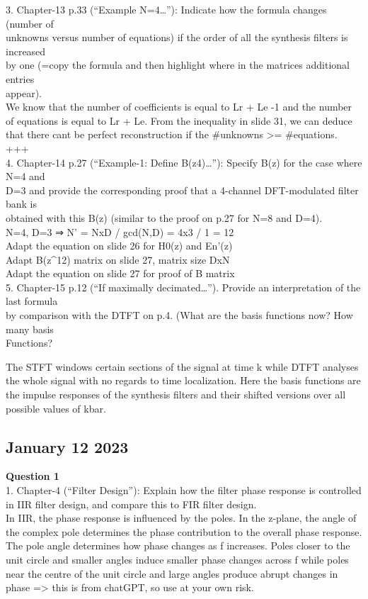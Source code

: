 \documentclass[
  a4paper,
  ,captions=tableheading
]{scrartcl}
\begin{document}
3. Chapter-13 p.33 (``Example N=4\ldots''): Indicate how the formula
changes (number of\\
unknowns versus number of equations) if the order of all the synthesis
filters is increased\\
by one (=copy the formula and then highlight where in the matrices
additional entries\\
appear).\\
We know that the number of coefficients is equal to Lr + Le -1 and the
number of equations is equal to Lr + Le. From the inequality in slide
31, we can deduce that there cant be perfect reconstruction if the
\#unknowns \textgreater= \#equations.\\
+++\\
4. Chapter-14 p.27 (``Example-1: Define B(z4)\ldots''): Specify B(z) for
the case where N=4 and\\
D=3 and provide the corresponding proof that a 4-channel DFT-modulated
filter bank is\\
obtained with this B(z) (similar to the proof on p.27 for N=8 and
D=4).\\
N=4, D=3 ⇒ N' = NxD / gcd(N,D) = 4x3 / 1 = 12\\
Adapt the equation on slide 26 for H0(z) and En'(z)\\
Adapt B(z\^{}12) matrix on slide 27, matrix size DxN\\
Adapt the equation on slide 27 for proof of B matrix\\
5. Chapter-15 p.12 (``If maximally decimated\ldots''). Provide an
interpretation of the last formula\\
by comparison with the DTFT on p.4. (What are the basis functions now?
How many basis\\
Functions?

The STFT windows certain sections of the signal at time k while DTFT
analyses the whole signal with no regards to time localization. Here the
basis functions are the impulse responses of the synthesis filters and
their shifted versions over all possible values of kbar.

\subsection{January 12 2023}\label{january-12-2023}

\textbf{Question 1}\\
1. Chapter-4 (``Filter Design''): Explain how the filter phase response
is controlled in IIR filter design, and compare this to FIR filter
design.\\
In IIR, the phase response is influenced by the poles. In the z-plane,
the angle of the complex pole determines the phase contribution to the
overall phase response. The pole angle determines how phase changes as f
increases. Poles closer to the unit circle and smaller angles induce
smaller phase changes across f while poles near the centre of the unit
circle and large angles produce abrupt changes in phase =\textgreater{}
this is from chatGPT, so use at your own risk.
\end{document}
